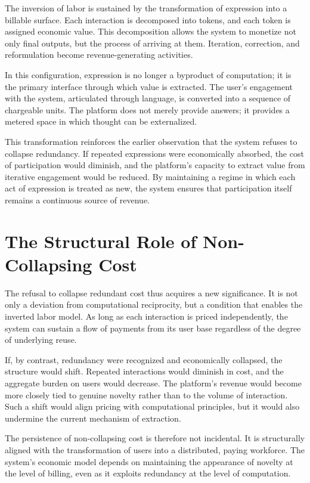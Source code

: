 \documentclass[12pt, oneside]{article}
\begin{document}
The inversion of labor is sustained by the transformation of expression into a billable surface. Each interaction is decomposed into tokens, and each token is assigned economic value. This decomposition allows the system to monetize not only final outputs, but the process of arriving at them. Iteration, correction, and reformulation become revenue-generating activities.

In this configuration, expression is no longer a byproduct of computation; it is the primary interface through which value is extracted. The user's engagement with the system, articulated through language, is converted into a sequence of chargeable units. The platform does not merely provide answers; it provides a metered space in which thought can be externalized.

This transformation reinforces the earlier observation that the system refuses to collapse redundancy. If repeated expressions were economically absorbed, the cost of participation would diminish, and the platform's capacity to extract value from iterative engagement would be reduced. By maintaining a regime in which each act of expression is treated as new, the system ensures that participation itself remains a continuous source of revenue.

\section{The Structural Role of Non-Collapsing Cost}

The refusal to collapse redundant cost thus acquires a new significance. It is not only a deviation from computational reciprocity, but a condition that enables the inverted labor model. As long as each interaction is priced independently, the system can sustain a flow of payments from its user base regardless of the degree of underlying reuse.

If, by contrast, redundancy were recognized and economically collapsed, the structure would shift. Repeated interactions would diminish in cost, and the aggregate burden on users would decrease. The platform's revenue would become more closely tied to genuine novelty rather than to the volume of interaction. Such a shift would align pricing with computational principles, but it would also undermine the current mechanism of extraction.

The persistence of non-collapsing cost is therefore not incidental. It is structurally aligned with the transformation of users into a distributed, paying workforce. The system's economic model depends on maintaining the appearance of novelty at the level of billing, even as it exploits redundancy at the level of computation.
\end{document}
